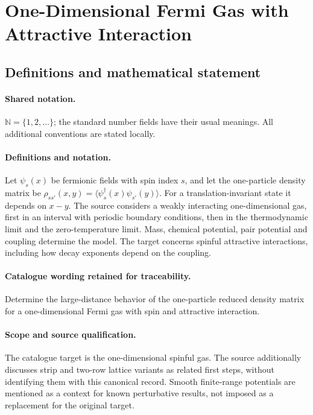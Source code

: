 \documentclass[11pt]{article}
\begin{document}
\section{One-Dimensional Fermi Gas with Attractive Interaction}\label{statement}

\subsection{Definitions and mathematical statement}

\paragraph{Shared notation.}$\mathbb N=\{1,2,\ldots\}$; the standard number fields have their usual meanings. All additional conventions are stated locally.


\paragraph{Definitions and notation.}Let $\psi_s(x)$ be fermionic fields with spin index $s$, and let the one-particle density matrix be $\rho_{ss'}(x,y)=\langle\psi_s^\dagger(x)\psi_{s'}(y)\rangle$. For a translation-invariant state it depends on $x-y$. The source considers a weakly interacting one-dimensional gas, first in an interval with periodic boundary conditions, then in the thermodynamic limit and the zero-temperature limit. Mass, chemical potential, pair potential and coupling determine the model. The target concerns spinful attractive interactions, including how decay exponents depend on the coupling.

\paragraph{Catalogue wording retained for traceability.}
Determine the large-distance behavior of the one-particle reduced density matrix for a one-dimensional Fermi gas with spin and attractive interaction.
\paragraph{Scope and source qualification.}The catalogue target is the one-dimensional spinful gas. The source additionally discusses strip and two-row lattice variants as related first steps, without identifying them with this canonical record. Smooth finite-range potentials are mentioned as a context for known perturbative results, not imposed as a replacement for the original target.
\end{document}
